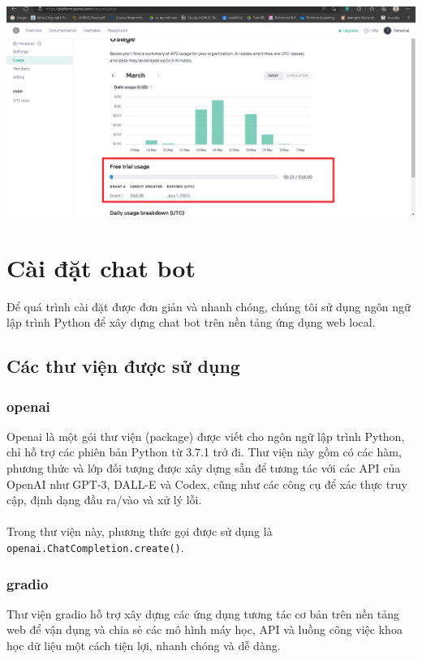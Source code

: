 \documentclass[a4paper, 12pt]{article}
\begin{document}
\begin{itemize}
\begin{centering}
		\includegraphics[width = 170mm]{4.5.png}
	\end{centering}
	\end{itemize}
	
	\section{Cài đặt chat bot}
	Để quá trình cài đặt được đơn giản và nhanh chóng, chúng tôi sử dụng ngôn ngữ lập trình Python để xây dựng chat bot trên nền tảng ứng dụng web local.
	\subsection{Các thư viện được sử dụng}
		\subsubsection{openai}
		Openai là một gói thư viện (package) được viết cho ngôn ngữ lập trình Python, chỉ hỗ trợ các phiên bản Python từ 3.7.1 trở đi. Thư viện này gồm có các hàm, phương thức và lớp đối tượng được xây dựng sẵn để tương tác với các API của OpenAI như GPT-3, DALL-E và Codex, cũng như các công cụ để xác thực truy cập, định dạng đầu ra/vào và xử lý lỗi.
		\\
		\\
		Trong thư viện này, phương thức gọi được sử dụng là \texttt{openai.ChatCompletion.create()}.\\
		\subsubsection{gradio}
		Thư viện gradio hỗ trợ xây dựng các ứng dụng tương tác cơ bản trên nền tảng web để vận dụng và chia sẻ các mô hình  máy học, API và luồng công việc khoa học dữ liệu một cách tiện lợi, nhanh chóng và dễ dàng.
	
\end{document}
